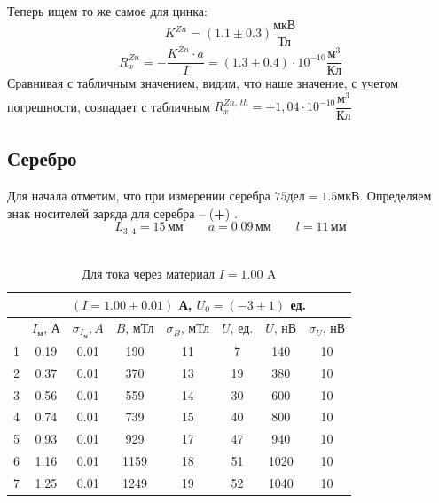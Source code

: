 \documentclass[a4paper,12pt]{article}
\theoremstyle{definition}
\begin{document}
    Теперь ищем то же самое для цинка: 
    $$K^{Zn} = (1.1 \pm 0.3) \dfrac{\text{мкВ}}{\text{Тл}}$$
    $$R_x^{Zn} = - \dfrac{K^{Zn} \cdot a}{I} = (1.3 \pm 0.4) \cdot 10^{-10} \dfrac{\text{м}^3}{\text{Кл}}$$
    Сравнивая с табличным значением, видим, что наше значение, с учетом погрешности, совпадает с табличным $R_x^{Zn,\,th} = +1,04 \cdot 10^{-10} \dfrac{\text{м}^3}{\text{Кл}}$\\


    \subsection{Серебро}
    Для начала отметим, что при измерении серебра $75\text{дел} = 1.5\text{мкВ}$.
    Определяем знак носителей заряда для серебра -- (\textbf{+}) . \\
    $$L_{3,4} = 15\,\text{мм} \qquad a = 0.09\,\text{мм} \qquad l = 11\,\text{мм}$$ \\

    \begin{table}[H]
      \centering
      \caption{Для тока через материал $I = 1.00$ A}
      \label{tabular:arg1}
        \begin{tabular}{|c|c|c|c|c|c|c|c|} \hline
            & \multicolumn{7}{c|}{$(I = 1.00 \pm 0.01)$ А, \qquad $U_0 = (-3 \pm 1)$ ед.} \\ \hline
            & $I_{\text{м}}$, А & $\sigma_{I_{\text{м}}}, A$ & $B$, мТл & $\sigma_B$, мТл & $U$, ед. & $U$, нВ & $\sigma_{U}$, нВ \\ \hline
          1 & 0.19 & 0.01 &  190 & 11 & 7 & 140 & 10 \\ \hline
          2 & 0.37 & 0.01 &  370 & 13 & 19 & 380 & 10 \\ \hline
          3 & 0.56 & 0.01 &  559 & 14 & 30 & 600 & 10 \\ \hline
          4 & 0.74 & 0.01 &  739 & 15 & 40 & 800 & 10 \\ \hline
          5 & 0.93 & 0.01 &  929 & 17 & 47 & 940 & 10 \\ \hline
          6 & 1.16 & 0.01 & 1159 & 18 & 51 & 1020 & 10 \\ \hline
          7 & 1.25 & 0.01 & 1249 & 19 & 52 & 1040 & 10 \\ \hline
        \end{tabular}\\
    \end{table}
\end{document}
